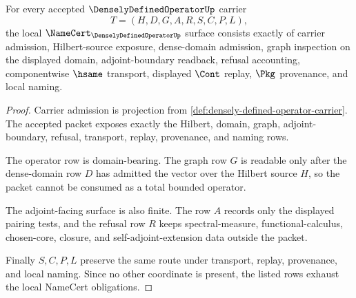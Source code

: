 \begin{theorem}
\label{thm:densely-defined-operator-namecert-obligations}
For every accepted $\DenselyDefinedOperatorUp$ carrier
$$
T=(H,D,G,A,R,S,C,P,L),
$$
the local $\NameCert_{\DenselyDefinedOperatorUp}$ surface consists exactly of carrier admission, Hilbert-source exposure, dense-domain admission, graph inspection on the displayed domain, adjoint-boundary readback, refusal accounting, componentwise $\hsame$ transport, displayed $\Cont$ replay, $\Pkg$ provenance, and local naming.
\end{theorem}
\begin{proof}
Carrier admission is projection from \autoref{def:densely-defined-operator-carrier}. The accepted packet exposes exactly the Hilbert, domain, graph, adjoint-boundary, refusal, transport, replay, provenance, and naming rows.

The operator row is domain-bearing. The graph row $G$ is readable only after the dense-domain row $D$ has admitted the vector over the Hilbert source $H$, so the packet cannot be consumed as a total bounded operator.

The adjoint-facing surface is also finite. The row $A$ records only the displayed pairing tests, and the refusal row $R$ keeps spectral-measure, functional-calculus, chosen-core, closure, and self-adjoint-extension data outside the packet.

Finally $S,C,P,L$ preserve the same route under transport, replay, provenance, and local naming. Since no other coordinate is present, the listed rows exhaust the local NameCert obligations.
\end{proof}

